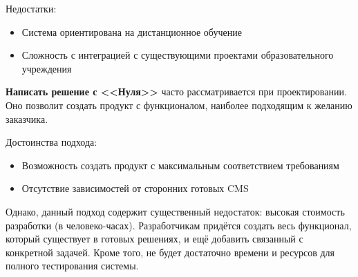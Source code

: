 \documentclass[a4paper,14pt]{article}
\begin{document}
Недостатки:

\begin{itemize}
	\item Система ориентирована на дистанционное обучение
	\item Сложность с интеграцией с существующими проектами образовательного учреждения
\end{itemize}

\textbf{Написать решение с <<Нуля>>} часто рассматривается при проектировании.
Оно позволит создать продукт с функционалом, наиболее подходящим к желанию заказчика.

Достоинства подхода:

\begin{itemize}
	\item Возможность создать продукт с максимальным соответствием требованиям
	\item Отсутствие зависимостей от сторонних готовых CMS 
\end{itemize}

Однако, данный подход содержит существенный недостаток: высокая стоимость разработки (в человеко-часах).
Разработчикам придётся создать весь функционал, который существует в готовых решениях,  и ещё добавить связанный с конкретной задачей.
Кроме того, не будет достаточно времени и ресурсов для полного тестирования системы.
\end{document}
